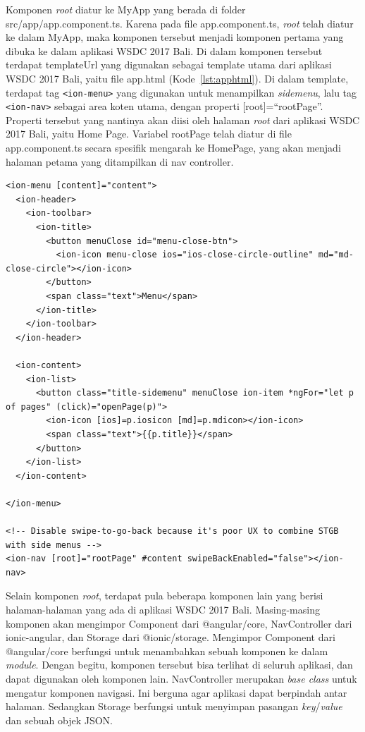 Komponen \textit{root} diatur ke MyApp yang berada di folder src/app/app.component.ts. Karena pada file app.component.ts, \textit{root} telah diatur ke dalam MyApp, maka komponen tersebut menjadi komponen pertama yang dibuka ke dalam aplikasi WSDC 2017 Bali. Di dalam komponen tersebut terdapat templateUrl yang digunakan sebagai template utama dari aplikasi WSDC 2017 Bali, yaitu file app.html (Kode~\ref{lst:apphtml}). Di dalam template, terdapat tag \texttt{<ion-menu>} yang digunakan untuk menampilkan \textit{sidemenu}, lalu tag \texttt{<ion-nav>} sebagai area koten utama, dengan properti [root]=``rootPage''. Properti tersebut yang nantinya akan diisi oleh halaman \textit{root} dari aplikasi WSDC 2017 Bali, yaitu Home Page. Variabel rootPage telah diatur di file app.component.ts secara spesifik mengarah ke HomePage, yang akan menjadi halaman petama yang ditampilkan di nav controller. 

\newpage

\begin{lstlisting}[label={lst:apphtml}, caption=\textit{Source Code} File app.html]
<ion-menu [content]="content">
  <ion-header>
    <ion-toolbar>
      <ion-title>
        <button menuClose id="menu-close-btn">
          <ion-icon menu-close ios="ios-close-circle-outline" md="md-close-circle"></ion-icon>
        </button>
        <span class="text">Menu</span>
      </ion-title>
    </ion-toolbar>
  </ion-header>

  <ion-content>
    <ion-list>
      <button class="title-sidemenu" menuClose ion-item *ngFor="let p of pages" (click)="openPage(p)">
        <ion-icon [ios]=p.iosicon [md]=p.mdicon></ion-icon>
        <span class="text">{{p.title}}</span>
      </button>
    </ion-list>
  </ion-content>

</ion-menu>

<!-- Disable swipe-to-go-back because it's poor UX to combine STGB with side menus -->
<ion-nav [root]="rootPage" #content swipeBackEnabled="false"></ion-nav>

\end{lstlisting} 

Selain komponen \textit{root}, terdapat pula beberapa komponen lain yang berisi halaman-halaman yang ada di aplikasi WSDC 2017 Bali. Masing-masing komponen akan mengimpor Component dari @angular/core, NavController dari ionic-angular, dan Storage dari @ionic/storage. Mengimpor Component dari @angular/core berfungsi untuk menambahkan sebuah komponen ke dalam \textit{module}. Dengan begitu, komponen tersebut bisa terlihat di seluruh aplikasi, dan dapat digunakan oleh komponen lain. NavController merupakan \textit{base class} untuk mengatur komponen navigasi. Ini berguna agar aplikasi dapat berpindah antar halaman. Sedangkan Storage berfungsi untuk menyimpan pasangan \textit{key}/\textit{value} dan sebuah objek JSON.

